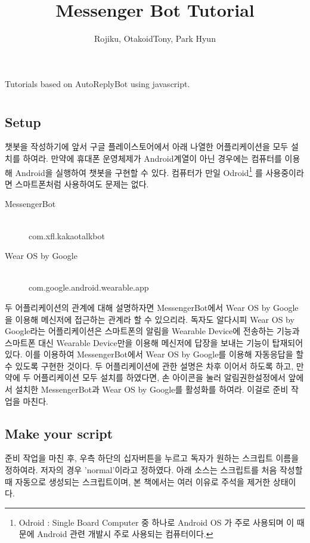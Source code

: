\documentclass[10pt,b6paper,final]{book}
\author{Rojiku, OtakoidTony, Park Hyun}
\title{Messenger Bot Tutorial}
\begin{document}
\maketitle
Tutorials based on AutoReplyBot using javascript.\\



\chapter{}
\section{Setup}
챗봇을 작성하기에 앞서 구글 플레이스토어에서 아래 나열한 어플리케이션을 모두 설치를 하여라.
만약에 휴대폰 운영체제가 Android계열이 아닌 경우에는 컴퓨터를 이용해 Android을 실행하여 
챗봇을 구현할 수 있다. 컴퓨터가 만일 Odroid\footnote{Odroid : Single Board Computer 중 하나로 Android OS 가 주로 사용되며 이 때문에 Android 관련 개발시 주로 사용되는 컴퓨터이다.} 를 사용중이라면 스마트폰처럼 사용하여도 문제는
없다.

\begin{description}
\item[MessengerBot]\hfill\\
com.xfl.kakaotalkbot
\item[Wear OS by Google]\hfill\\
com.google.android.wearable.app
\end{description}
두 어플리케이션의 관계에 대해 설명하자면 MessengerBot에서 
Wear OS by Google을 이용해 메신저에 접근하는 관계라 할 수 있으리라.
독자도 알다시피 Wear OS by Google라는 어플리케이션은 스마트폰의 알림을
Wearable Device에 전송하는 기능과 스마트폰 대신 Wearable Device만을
이용해 메신저에 답장을 보내는 기능이 탑재되어 있다.
이를 이용하여 MessengerBot에서 Wear OS by Google를 이용해 자동응답을
할 수 있도록 구현한 것이다. 두 어플리케이션에 관한 설명은 차후 이어서 하도록 하고,
만약에 두 어플리케이션 모두 설치를 하였다면, 손 아이콘을 눌러 알림권한설정에서 앞에서 설치한
MessengerBot과 Wear OS by Google를 활성화를 하여라. 이걸로 준비 작업을 마친다.

\section{Make your script}
준비 작업을 마친 후, 우측 하단의 십자버튼을 누르고 독자가 원하는 스크립트 이름을 정하여라.
저자의 경우 'normal'이라고 정하였다.
아래 소스는 스크립트를 처음 작성할 때 자동으로 생성되는 스크립트이며,
본 책에서는 여러 이유로 주석을 제거한 상태이다.
\end{document}
